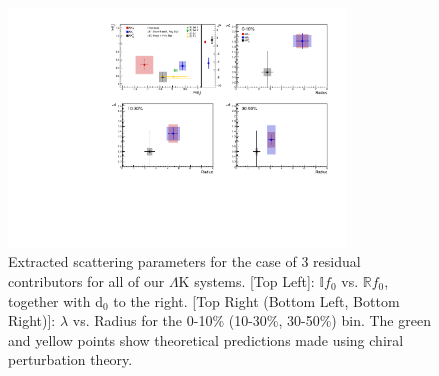 \documentclass[../AnalysisNoteJBuxton.tex]{subfiles}
\begin{document}
\begin{figure}[h]
  \centering
  \includegraphics[width=0.80\textwidth]{7_ResultsAndDiscussion/Figures/CompareAllScattParams_Comp3An_3Res.pdf}
  \caption[Extracted Scattering Parameters: 3 Residuals in Fit]{Extracted scattering parameters for the case of 3 residual contributors for all of our $\Lambda$K systems.  [Top Left]: $\mathbb{I}f_{0}$ vs. $\mathbb{R}f_{0}$, together with d$_{0}$ to the right.  [Top Right (Bottom Left, Bottom Right)]: $\lambda$ vs. Radius for the 0-10\% (10-30\%, 30-50\%) bin.  The green \cite{Liu:2006xja} and yellow \cite{Mai:2009ce} points show theoretical predictions made using chiral perturbation theory.}
  \label{fig:ScattParams_Final}
\end{figure}

\clearpage





\end{document}
